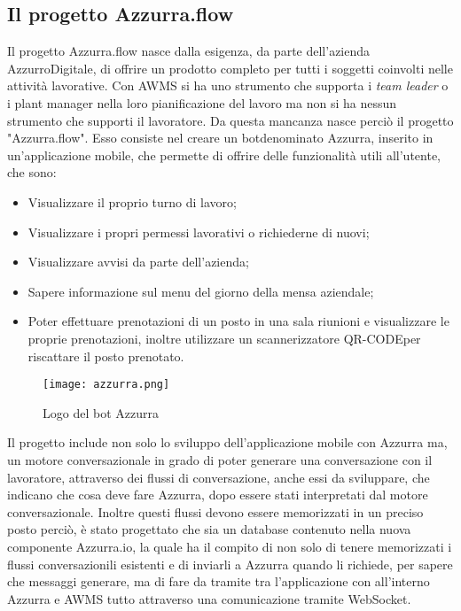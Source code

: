 \subsection{Il progetto Azzurra.flow}

Il progetto Azzurra.flow nasce dalla esigenza, da parte dell'azienda AzzurroDigitale, di offrire un prodotto completo per tutti i soggetti coinvolti nelle attività lavorative. Con \gls{AWMS}\ap{[g]} si ha uno strumento che supporta i \emph{team leader} o i \gls{plant manager}\ap{[g]} nella loro pianificazione del lavoro ma non si ha nessun strumento che supporti il lavoratore. Da questa mancanza nasce perciò il progetto "Azzurra.flow". Esso consiste nel creare un \gls{bot}\glsfirstoccur denominato Azzurra, inserito in un’applicazione mobile, che permette di offrire delle funzionalità utili all'utente, che sono:
\begin{itemize}
	\item Visualizzare il proprio turno di lavoro;
	\item Visualizzare i propri permessi lavorativi o richiederne di nuovi;
	\item Visualizzare avvisi da parte dell'azienda;
	\item Sapere informazione sul menu del giorno della mensa aziendale;
	\item Poter effettuare prenotazioni di un posto in una sala riunioni e visualizzare le proprie prenotazioni, inoltre utilizzare un scannerizzatore \gls{QR-CODE}\glsfirstoccur per riscattare il posto prenotato.
\end{itemize}
\begin{figure}[!h] 
	\begin{center}
		\texttt{[image: azzurra.png]}
		\caption{Logo del bot Azzurra}
	\end{center}
\end{figure}
Il progetto include non solo lo sviluppo dell'applicazione mobile con Azzurra ma, un motore conversazionale in grado di poter generare una conversazione con il lavoratore, attraverso dei flussi di conversazione, anche essi da sviluppare, che indicano che cosa deve fare Azzurra, dopo essere stati interpretati dal motore conversazionale. Inoltre questi flussi devono essere memorizzati in un preciso posto perciò, è stato progettato che sia un database contenuto nella nuova componente Azzurra.io, la quale ha il compito di non solo di tenere memorizzati i flussi conversazionili esistenti e di inviarli a Azzurra quando li richiede, per sapere che messaggi generare, ma di fare da tramite tra l'applicazione con all'interno Azzurra e \gls{AWMS}\ap{[g]} tutto attraverso una comunicazione tramite \gls{WebSocket}\glsfirstoccur.
